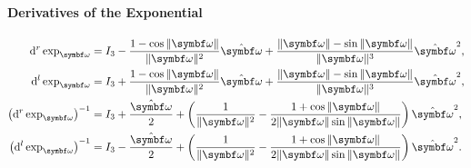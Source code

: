 \begin{properties}[breakable, title={$\SOthree$ parameterized by $\Sthree$}]
  \paragraph{Derivatives of the Exponential}
  \begin{subequations}
    \begin{align}
      \mathrm{d}^r \exp_{\bomega}                     & =        I_3 - \frac{1 - \cos \| \bomega \|}{\| \bomega \|^2} \hat {\bomega} + \frac{ \| \bomega \| - \sin \| \bomega \| }{\| \bomega\|^3} \hat {\bomega}^2, \\
      \mathrm{d}^l \exp_{\bomega}                     & = I_3 + \frac{1 - \cos \| \bomega \|}{\| \bomega \|^2} \hat {\bomega} + \frac{ \| \bomega \| - \sin \| \bomega \| }{\| \bomega\|^3} \hat {\bomega}^2,        \\
      \left( \mathrm{d}^r \exp_{\bomega} \right)^{-1} & = I_3 + \frac{\hat \bomega}{2} + \left( \frac{1}{\| \bomega \|^2} - \frac{1 + \cos \| \bomega \| }{2 \|\bomega \| \sin \|\bomega \|} \right) \hat \bomega^2, \\
      \left( \mathrm{d}^l \exp_{\bomega} \right)^{-1} & = I_3 - \frac{\hat \bomega}{2} + \left( \frac{1}{\| \bomega \|^2} - \frac{1 + \cos \| \bomega \| }{2 \|\bomega \| \sin \|\bomega \|} \right) \hat \bomega^2.
    \end{align}
  \end{subequations}
\end{properties}

